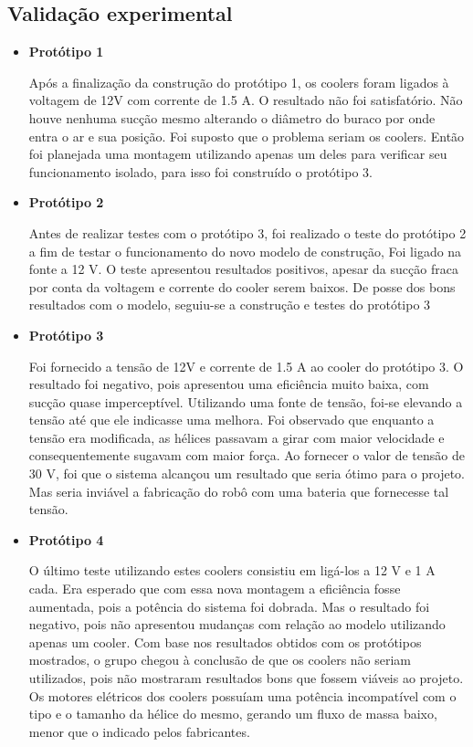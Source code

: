 \subsection{Validação experimental} %
	\label{sub:validação_experimental}
\begin{itemize}
\item \textbf{Protótipo 1}

Após a finalização da construção do protótipo 1, os coolers foram ligados à voltagem de 12V com corrente de 1.5 A. O resultado não foi satisfatório. Não houve nenhuma sucção mesmo alterando o diâmetro do buraco por onde entra o ar e sua posição. Foi suposto que o problema seriam os coolers. Então foi planejada uma montagem utilizando apenas um deles para verificar seu funcionamento isolado, para isso foi construído o protótipo 3. 

\item \textbf{Protótipo 2}

Antes de realizar testes com o protótipo 3, foi realizado o teste do protótipo 2 a fim de testar o funcionamento do novo modelo de construção, Foi ligado na fonte a 12 V. O teste apresentou resultados positivos, apesar da sucção fraca por conta da voltagem e corrente do cooler serem baixos. De posse dos bons resultados com o modelo, seguiu-se a construção e testes do protótipo 3

\item \textbf{Protótipo 3}

Foi fornecido a tensão de 12V e corrente de 1.5 A ao cooler do protótipo 3. O resultado foi negativo, pois apresentou uma eficiência muito baixa, com sucção quase imperceptível. Utilizando uma fonte de tensão, foi-se elevando a tensão até que ele indicasse uma melhora. Foi observado que enquanto a tensão era modificada, as hélices passavam a girar com maior velocidade e consequentemente sugavam com maior força. Ao fornecer o valor de tensão de 30 V, foi que o sistema alcançou um resultado que seria ótimo para o projeto. Mas seria inviável a fabricação do robô com uma bateria que fornecesse tal tensão.

\item \textbf{Protótipo 4} 

O último teste utilizando estes coolers consistiu em ligá-los a 12 V e 1 A cada. Era esperado que com essa nova montagem a eficiência fosse aumentada, pois a potência do sistema foi dobrada. Mas o resultado foi negativo, pois não apresentou mudanças com relação ao modelo utilizando apenas um cooler. Com base nos resultados obtidos com os protótipos mostrados, o grupo chegou à conclusão de que os coolers não seriam utilizados, pois não mostraram resultados bons que fossem viáveis ao projeto. Os motores elétricos dos coolers possuíam uma potência incompatível com o tipo e o tamanho da hélice do mesmo, gerando um fluxo de massa baixo, menor que o indicado pelos fabricantes. 


\end{itemize}
